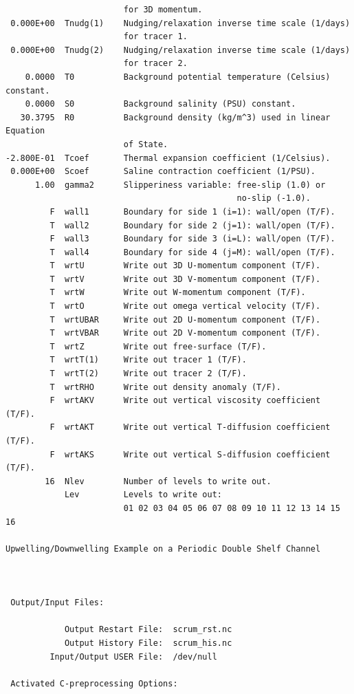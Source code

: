 \begin{verbatim}
                        for 3D momentum.
 0.000E+00  Tnudg(1)    Nudging/relaxation inverse time scale (1/days)
                        for tracer 1.
 0.000E+00  Tnudg(2)    Nudging/relaxation inverse time scale (1/days)
                        for tracer 2.
    0.0000  T0          Background potential temperature (Celsius) constant.
    0.0000  S0          Background salinity (PSU) constant.
   30.3795  R0          Background density (kg/m^3) used in linear Equation
                        of State.
-2.800E-01  Tcoef       Thermal expansion coefficient (1/Celsius).
 0.000E+00  Scoef       Saline contraction coefficient (1/PSU).
      1.00  gamma2      Slipperiness variable: free-slip (1.0) or 
                                               no-slip (-1.0).
         F  wall1       Boundary for side 1 (i=1): wall/open (T/F).
         T  wall2       Boundary for side 2 (j=1): wall/open (T/F).
         F  wall3       Boundary for side 3 (i=L): wall/open (T/F).
         T  wall4       Boundary for side 4 (j=M): wall/open (T/F).
         T  wrtU        Write out 3D U-momentum component (T/F).
         T  wrtV        Write out 3D V-momentum component (T/F).
         T  wrtW        Write out W-momentum component (T/F).
         T  wrtO        Write out omega vertical velocity (T/F).
         T  wrtUBAR     Write out 2D U-momentum component (T/F).
         T  wrtVBAR     Write out 2D V-momentum component (T/F).
         T  wrtZ        Write out free-surface (T/F).
         T  wrtT(1)     Write out tracer 1 (T/F).
         T  wrtT(2)     Write out tracer 2 (T/F).
         T  wrtRHO      Write out density anomaly (T/F).
         F  wrtAKV      Write out vertical viscosity coefficient (T/F).
         F  wrtAKT      Write out vertical T-diffusion coefficient (T/F).
         F  wrtAKS      Write out vertical S-diffusion coefficient (T/F).
        16  Nlev        Number of levels to write out.
            Lev         Levels to write out:
                        01 02 03 04 05 06 07 08 09 10 11 12 13 14 15 16

Upwelling/Downwelling Example on a Periodic Double Shelf Channel
       


 Output/Input Files:

            Output Restart File:  scrum_rst.nc
            Output History File:  scrum_his.nc
         Input/Output USER File:  /dev/null

 Activated C-preprocessing Options:


\end{verbatim}
